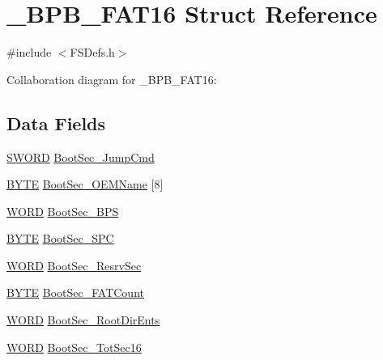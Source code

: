 \hypertarget{struct___b_p_b___f_a_t16}{}\section{\+\_\+\+B\+P\+B\+\_\+\+F\+A\+T16 Struct Reference}
\label{struct___b_p_b___f_a_t16}


{\ttfamily \#include $<$F\+S\+Defs.\+h$>$}



Collaboration diagram for \+\_\+\+B\+P\+B\+\_\+\+F\+A\+T16\+:
\subsection*{Data Fields}
\begin{DoxyCompactItemize}
\item 
\hyperlink{struct_s_w_o_r_d}{S\+W\+O\+R\+D} \hyperlink{struct___b_p_b___f_a_t16_ae5b5b0ce7c2b36b05f4feca437b0742a}{Boot\+Sec\+\_\+\+Jump\+Cmd}
\item 
\hyperlink{_generic_type_defs_8h_a4ae1dab0fb4b072a66584546209e7d58}{B\+Y\+T\+E} \hyperlink{struct___b_p_b___f_a_t16_ae5fce06ddd8aa2868537d62d324fd278}{Boot\+Sec\+\_\+\+O\+E\+M\+Name} \mbox{[}8\mbox{]}
\item 
\hyperlink{_generic_type_defs_8h_a2b0e863dadf920709ec53d9088ee7c91}{W\+O\+R\+D} \hyperlink{struct___b_p_b___f_a_t16_ad659c9ffa17932287cef58634e94b709}{Boot\+Sec\+\_\+\+B\+P\+S}
\item 
\hyperlink{_generic_type_defs_8h_a4ae1dab0fb4b072a66584546209e7d58}{B\+Y\+T\+E} \hyperlink{struct___b_p_b___f_a_t16_a8550ff725f1456f3790b39dce2e43b07}{Boot\+Sec\+\_\+\+S\+P\+C}
\item 
\hyperlink{_generic_type_defs_8h_a2b0e863dadf920709ec53d9088ee7c91}{W\+O\+R\+D} \hyperlink{struct___b_p_b___f_a_t16_a4da7001d1e395d0183666a5bd0f45a8c}{Boot\+Sec\+\_\+\+Resrv\+Sec}
\item 
\hyperlink{_generic_type_defs_8h_a4ae1dab0fb4b072a66584546209e7d58}{B\+Y\+T\+E} \hyperlink{struct___b_p_b___f_a_t16_a4650a56f7161008b1f07ba125a61d526}{Boot\+Sec\+\_\+\+F\+A\+T\+Count}
\item 
\hyperlink{_generic_type_defs_8h_a2b0e863dadf920709ec53d9088ee7c91}{W\+O\+R\+D} \hyperlink{struct___b_p_b___f_a_t16_a1c68f488ba8ec4c51228d23a8cba7213}{Boot\+Sec\+\_\+\+Root\+Dir\+Ents}
\item 
\hyperlink{_generic_type_defs_8h_a2b0e863dadf920709ec53d9088ee7c91}{W\+O\+R\+D} \hyperlink{struct___b_p_b___f_a_t16_ab2d1ff530ec98d72b60e2e78ea079e3a}{Boot\+Sec\+\_\+\+Tot\+Sec16}

\end{DoxyCompactItemize}

